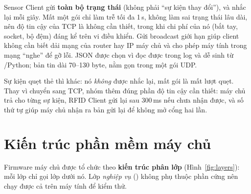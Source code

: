\begin{lydo}
Sensor Client gửi \textbf{toàn bộ trạng thái} (không phải ``sự kiện thay đổi''), và
nhắc lại mỗi giây. Mất một gói chỉ làm trễ tối đa 1\,s, không làm sai trạng thái lâu
dài, nên độ tin cậy của TCP là không cần thiết, trong khi chi phí của nó (bắt tay,
socket, bộ đệm) đáng kể trên vi điều khiển. Gửi broadcast giới hạn
 giúp client không cần biết dải mạng của router hay IP máy chủ
và cho phép máy tính trong mạng ``nghe'' để gỡ lỗi. JSON được chọn vì đọc
được trong log và dễ sinh từ /Python; bản tin dài 70–130 byte, nằm
gọn trong một gói UDP.

Sự kiện quẹt thẻ thì khác: nó \emph{không} được nhắc lại, mất gói là mất lượt quẹt.
Thay vì chuyển sang TCP, nhóm thêm đúng phần độ tin cậy cần thiết: máy chủ trả
 cho từng sự kiện, RFID Client gửi lại sau 300\,ms nếu chưa nhận được, và
số thứ tự giúp máy chủ nhận ra bản gửi lại để không mở cổng hai lần.
\end{lydo}

\section{Kiến trúc phần mềm máy chủ}\label{sec:phanlop}
Firmware máy chủ được tổ chức theo \textbf{kiến trúc phân lớp} (Hình~\ref{fig:layers}):
mỗi lớp chỉ gọi lớp dưới nó. Lớp \emph{nghiệp vụ} () không phụ thuộc
phần cứng nên chạy được cả trên máy tính để kiểm thử.

